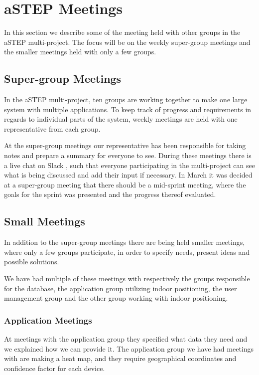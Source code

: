 \section{aSTEP Meetings}
In this section we describe some of the meeting held with other groups in the aSTEP multi-project. The focus will be on the weekly super-group meetings and the smaller meetings held with only a few groups.

\subsection*{Super-group Meetings}\label{subsec:supergroup_meetings}
In the aSTEP multi-project, ten groups are working together to make one large system with multiple applications. To keep track of progress and requirements in regards to individual parts of the system, weekly meetings are held with one representative from each group.

At the super-group meetings our representative has been responsible for taking notes and prepare a summary for everyone to see. During these meetings there is a live chat on Slack \cite{slack}, such that everyone participating in the multi-project can see what is being discussed and add their input if necessary. In March it was decided at a super-group meeting that there should be a mid-sprint meeting, where the goals for the sprint was presented and the progress thereof evaluated.

\subsection*{Small Meetings}\label{subsec:small_meetings}
In addition to the super-group meetings there are being held smaller meetings, where only a few groups participate, in order to specify needs, present ideas and possible solutions.

We have had multiple of these meetings with respectively the groups responsible for the database, the application group utilizing indoor positioning, the user management group and the other group working with indoor positioning.
 
\subsubsection*{Application Meetings}
At meetings with the application group they specified what data they need and we explained how we can provide it. The application group we have had meetings with are making a heat map, and they require geographical coordinates and confidence factor for each device.


